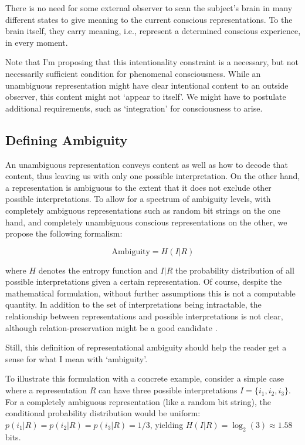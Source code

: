 \documentclass[11pt]{article}
\begin{document}
There is no need for some external observer to scan the subject's brain in many different states to give meaning to the current conscious representations. To the brain itself, they carry meaning, i.e., represent a determined conscious experience, in every moment.

Note that I'm proposing that this intentionality constraint is a necessary, but not necessarily sufficient condition for phenomenal consciousness. While an unambiguous representation might have clear intentional content to an outside observer, this content might not `appear to itself'. We might have to postulate additional requirements, such as `integration' for consciousness to arise.

\subsection{Defining Ambiguity}

An unambiguous representation conveys content as well as how to decode that content, thus leaving us with only one possible interpretation. On the other hand, a representation is ambiguous to the extent that it does not exclude other possible interpretations. To allow for a spectrum of ambiguity levels, with completely ambiguous representations such as random bit strings on the one hand, and completely unambiguous conscious representations on the other, we propose the following formalism:

\begin{equation}
\text{Ambiguity} = H(I|R)
\end{equation}

where $H$ denotes the entropy function and $I|R$ the probability distribution of all possible interpretations given a certain representation. Of course, despite the mathematical formulation, without further assumptions this is not a computable quantity. In addition to the set of interpretations being intractable, the relationship between representations and possible interpretations is not clear, although relation-preservation might be a good candidate \cite{kleiner2024}.

Still, this definition of representational ambiguity should help the reader get a sense for what I mean with `ambiguity'.

To illustrate this formulation with a concrete example, consider a simple case where a representation $R$ can have three possible interpretations $I = \{i_1, i_2, i_3\}$. For a completely ambiguous representation (like a random bit string), the conditional probability distribution would be uniform: $p(i_1|R) = p(i_2|R) = p(i_3|R) = 1/3$, yielding $H(I|R) = \log_2(3) \approx 1.58$ bits.
\end{document}
